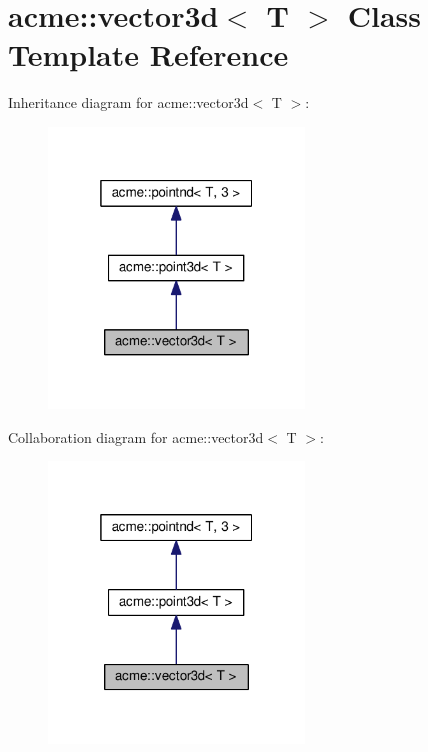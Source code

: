 \hypertarget{classacme_1_1vector3d}{}\section{acme\+:\+:vector3d$<$ T $>$ Class Template Reference}
\label{classacme_1_1vector3d}


Inheritance diagram for acme\+:\+:vector3d$<$ T $>$\+:
\nopagebreak
\begin{figure}[H]
\begin{center}
\leavevmode
\includegraphics[width=193pt]{d1/d53/classacme_1_1vector3d__inherit__graph}
\end{center}
\end{figure}


Collaboration diagram for acme\+:\+:vector3d$<$ T $>$\+:
\nopagebreak
\begin{figure}[H]
\begin{center}
\leavevmode
\includegraphics[width=193pt]{d0/d2c/classacme_1_1vector3d__coll__graph}
\end{center}
\end{figure}
